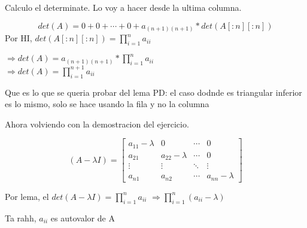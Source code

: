 \begin{itemize}
        Calculo el determinate. Lo voy a hacer desde la ultima columna. 

        $$ det(A) = 0 + 0 + \cdots + 0 + a_{(n+1)(n+1)} * det(A[:n][:n]) $$
        Por HI, $det(A[:n][:n]) = \prod_{i=1}^{n} a_{ii}$

        $\Rightarrow det(A) = a_{(n+1)(n+1)} * \prod_{i=1}^{n}a_{ii}$ \\
        $\Rightarrow det(A) = \prod_{i=1}^{n + 1}a_{ii}$

        Que es lo que se queria probar del lema
        PD: el caso dodnde es triangular inferior es lo mismo, solo se hace usando la fila y no la columna

    Ahora volviendo con la demostracion del ejercicio.
   

    \[
        (A - \lambda I) = \begin{bmatrix}
            a_{11} - \lambda & 0 & \cdots & 0 \\
            a_{21} & a_{22} - \lambda & \cdots & 0  \\
            \vdots & \vdots & \ddots & \vdots \\
            a_{n1} & a_{n2} & \cdots & a_{nn} - \lambda
        \end{bmatrix}
            \]

    Por lema, el $det(A - \lambda I) = \prod_{i=1}^{n}a_{ii}$ 
    $\Rightarrow \prod_{i=1}^{n}(a_{ii} - \lambda) $

    Ta rahh, $a_{ii}$ es autovalor de A

    

    
\end{itemize}
